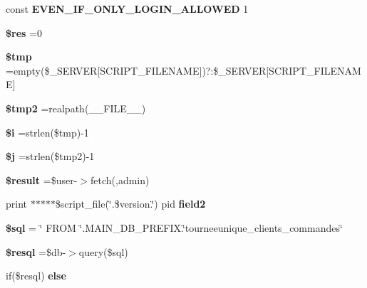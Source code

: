 \begin{DoxyCompactItemize}
const {\bfseries E\+V\+E\+N\+\_\+\+I\+F\+\_\+\+O\+N\+L\+Y\+\_\+\+L\+O\+G\+I\+N\+\_\+\+A\+L\+L\+O\+W\+ED} 1
\item 
\mbox{\label{tourneeunique__clients__commandes_8php_a49a8a4009b02e49717caa88b128affc5}} 
{\bfseries \$res} =0
\item 
\mbox{\label{tourneeunique__clients__commandes_8php_a57024d47cf8348153f5fdda16f8fefa9}} 
{\bfseries \$tmp} =empty(\$\+\_\+\+S\+E\+R\+V\+ER\mbox{[}\textquotesingle{}S\+C\+R\+I\+P\+T\+\_\+\+F\+I\+L\+E\+N\+A\+ME\textquotesingle{}\mbox{]})?\textquotesingle{}\textquotesingle{}\+:\$\+\_\+\+S\+E\+R\+V\+ER\mbox{[}\textquotesingle{}S\+C\+R\+I\+P\+T\+\_\+\+F\+I\+L\+E\+N\+A\+ME\textquotesingle{}\mbox{]}
\item 
\mbox{\label{tourneeunique__clients__commandes_8php_aed9bcb6730d1510376ce80e32bd9504d}} 
{\bfseries \$tmp2} =realpath(\+\_\+\+\_\+\+F\+I\+L\+E\+\_\+\+\_\+)
\item 
\mbox{\label{tourneeunique__clients__commandes_8php_a83018d9153d17d91fbcf3bc10158d34f}} 
{\bfseries \$i} =strlen(\$tmp)-\/1
\item 
\mbox{\label{tourneeunique__clients__commandes_8php_a6f16db779ef3ccea921b277b5dc245d1}} 
{\bfseries \$j} =strlen(\$tmp2)-\/1
\item 
\mbox{\label{tourneeunique__clients__commandes_8php_a112ef069ddc0454086e3d1e6d8d55d07}} 
{\bfseries \$result} =\$user-\/$>$fetch(\textquotesingle{}\textquotesingle{},\textquotesingle{}admin\textquotesingle{})
\item 
\mbox{\label{tourneeunique__clients__commandes_8php_af9edfce80596a171cfb2884ba7ad01df}} 
print $\ast$$\ast$$\ast$$\ast$$\ast$\$script\+\_\+file(\char`\"{}.\$version.\char`\"{}) pid {\bfseries field2}
\item 
\mbox{\label{tourneeunique__clients__commandes_8php_a047170d6020a882807665812a27e2525}} 
{\bfseries \$sql} = \char`\"{} F\+R\+OM \char`\"{}.M\+A\+I\+N\+\_\+\+D\+B\+\_\+\+P\+R\+E\+F\+I\+X.\char`\"{}tourneeunique\+\_\+clients\+\_\+commandes\char`\"{}
\item 
\mbox{\label{tourneeunique__clients__commandes_8php_a6adc5ef389ab51c21dee69262018d615}} 
{\bfseries \$resql} =\$db-\/$>$query(\$sql)
\item 
if(\$resql) {\bfseries else}
\end{DoxyCompactItemize}


